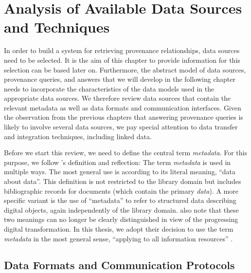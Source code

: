 \chapter{Analysis of Available Data Sources and Techniques}
\label{chap:analysis}

In order to build a system for retrieving provenance relationships,
data sources need to be selected. It is the aim of this chapter
to provide information for this selection can be based later on.
Furthermore, the abstract model of data sources, provenance queries, and answers
that we will develop in the following chapter
needs to incorporate the characteristics of the data models used in the appropriate data sources.
We therefore review data sources that contain the relevant metadata
as well as data formats and communication interfaces.
Given the observation from the previous chapters
that answering provenance queries is likely to involve several data sources,
we pay special attention to data transfer and integration techniques,
including linked data.

Before we start this review, we need to define the central term \emph{metadata}.
For this purpose, we follow \citeauthor{Hider2008}'s \autocite*{Hider2008} definition and reflection:
The term \emph{metadata} is used in multiple ways.
The most general use is according to its literal meaning, \enquote{data about data}.
This definition is not restricted to the library domain
but includes bibliographic records for documents (which contain the primary \emph{data}).
A more specific variant is the use of \enquote{metadata} to refer to
structured data describing digital objects,
again independently of the library domain. \citeauthor{Hider2008} also note that
these two meanings can no longer be clearly distinguished in view of the
progressing digital transformation. In this thesis, we adopt their
decision to use the term \emph{metadata} in the most general sense,
\enquote{applying to all information resources} \autocite[p.13]{Hider2008}.


\section{Data Formats and Communication Protocols}
\label{sec:data_models}


